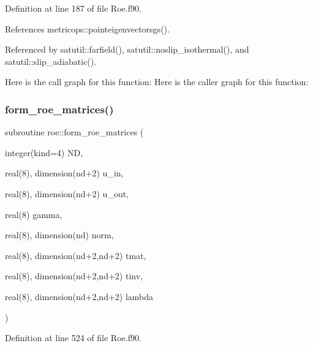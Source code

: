 Definition at line 187 of file Roe.\+f90.



References metricops\+::pointeigenvectorsgs().



Referenced by satutil\+::farfield(), satutil\+::noslip\+\_\+isothermal(), and satutil\+::slip\+\_\+adiabatic().

Here is the call graph for this function\+:
Here is the caller graph for this function\+:
\hypertarget{namespaceroe_aeea833f881434abaa203060c46f57fa5}{}\label{namespaceroe_aeea833f881434abaa203060c46f57fa5} 
\subsubsection{\texorpdfstring{form\+\_\+roe\+\_\+matrices()}{form\_roe\_matrices()}}
{\footnotesize\ttfamily subroutine roe\+::form\+\_\+roe\+\_\+matrices (\begin{DoxyParamCaption}\item[{integer(kind=4)}]{ND,  }\item[{real(8), dimension(nd+2)}]{u\+\_\+in,  }\item[{real(8), dimension(nd+2)}]{u\+\_\+out,  }\item[{real(8)}]{gamma,  }\item[{real(8), dimension(nd)}]{norm,  }\item[{real(8), dimension(nd+2,nd+2)}]{tmat,  }\item[{real(8), dimension(nd+2,nd+2)}]{tinv,  }\item[{real(8), dimension(nd+2,nd+2)}]{lambda }\end{DoxyParamCaption})}



Definition at line 524 of file Roe.\+f90.

\hypertarget{namespaceroe_a320726375f2fb7ec2dccfe644063dae0}{}\label{namespaceroe_a320726375f2fb7ec2dccfe644063dae0} 

